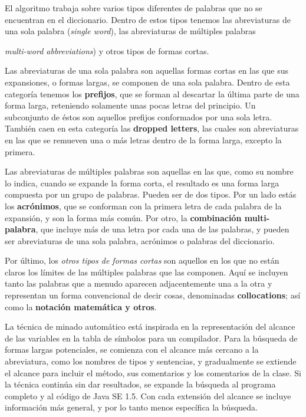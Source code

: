 El algoritmo trabaja sobre varios tipos diferentes de palabras que no se encuentran en el diccionario.
Dentro de estos tipos tenemos las abreviaturas de una sola palabra (\textit{single word}), las abreviaturas de múltiples palabras {\textit{multi-word abbreviations}) y otros tipos de formas cortas.

Las abreviaturas de una sola palabra son aquellas formas cortas en las que sus expansiones, o formas largas, se componen de una sola palabra.
Dentro de esta categoría tenemos los \textbf{prefijos}, que se forman al descartar la última parte de una forma larga, reteniendo solamente unas pocas letras del principio. Un subconjunto de éstos son aquellos prefijos conformados por una sola letra.
También caen en esta categoría las \textbf{dropped letters}, las cuales son abreviaturas en las que se remueven una o más letras dentro de la forma larga, excepto la primera.

Las abreviaturas de múltiples palabras son aquellas en las que, como su nombre lo indica, cuando se expande la forma corta, el resultado es una forma larga compuesta por un grupo de palabras.
Pueden ser de dos tipos.
Por un lado estás los \textbf{acrónimos}, que se conforman con la primera letra de cada palabra de la expansión, y son la forma más común.
Por otro, la \textbf{combinación multi-palabra}, que incluye más de una letra por cada una de las palabras, y pueden ser abreviaturas de una sola palabra, acrónimos o palabras del diccionario.

Por último, los \textit{otros tipos de formas cortas} son aquellos en los que no están claros los límites de las múltiples palabras que las componen.
Aquí se incluyen tanto las palabras que a menudo aparecen adjacentemente una a la otra y representan un forma convencional de decir cosas, denominadas \textbf{collocations}; así como la \textbf{notación matemática y otros}.

La técnica de minado automático está inspirada en la representación del alcance de las variables en la tabla de símbolos para un compilador.
Para la búsqueda de formas largas potenciales, se comienza con el alcance más cercano a la abreviatura, como los nombres de tipos y sentencias, y gradualmente se extiende el alcance para incluir el método, sus comentarios y los comentarios de la clase.
Si la técnica continúa sin dar resultados, se expande la búsqueda al programa completo y al código de Java SE 1.5.
Con cada extensión del alcance se incluye información más general, y por lo tanto menos específica la búsqueda.

}
